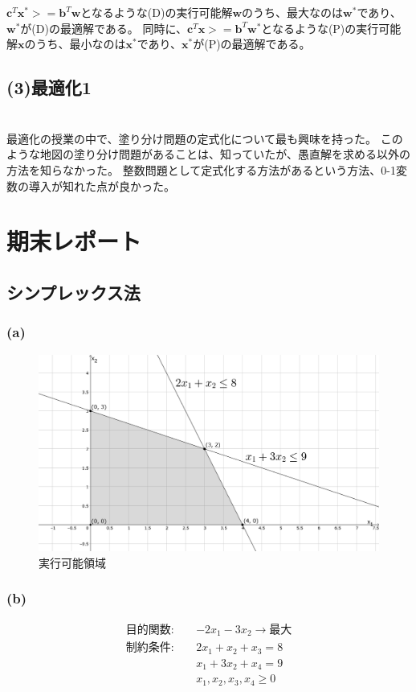 \documentclass[a4paper,12pt]{jsarticle}
\begin{document}
$\bm{c}^T\bm{x}^*>=\bm{b}^T\bm{w}$となるような(D)の実行可能解$\bm w$のうち、最大なのは$\bm w^*$であり、$\bm w^*$が(D)の最適解である。
同時に、$\bm c^T\bm x>=\bm b^T\bm w^*$となるような(P)の実行可能解$\bm x$のうち、最小なのは$\bm x^*$であり、$\bm x^*$が(P)の最適解である。

\subsection*{(3)最適化1}
\section{}
最適化の授業の中で、塗り分け問題の定式化について最も興味を持った。
このような地図の塗り分け問題があることは、知っていたが、愚直解を求める以外の方法を知らなかった。
整数問題として定式化する方法があるという方法、0-1変数の導入が知れた点が良かった。

\section{期末レポート}
\subsection{シンプレックス法}
\subsubsection*{(a)}
\begin{figure}[H]
  \centering
  \includegraphics[width=13cm]{01.png}
  \caption{実行可能領域}
  \label{実行可能領域}
\end{figure}

\subsubsection*{(b)}
\begin{align*}
  目的関数:\quad & -2x_1-3x_2 \rightarrow 最大 \\
  制約条件:\quad & 2x_1+x_2+x_3 = 8            \\
                 & x_1+3x_2+x_4 = 9            \\
                 & x_1,x_2,x_3,x_4\geq 0
\end{align*}
\end{document}
